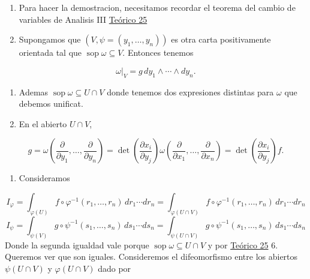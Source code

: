 \begin{bookproof}{}
\begin{enumerate}
\item Para hacer la demostracion, necesitamos recordar el teorema del cambio de variables de Analisis III \hyperref[blk:d9fdaa]{Teórico 25}
\item Supongamos que $(V,\psi=(y_1,\ldots,y_n))$ es otra carta positivamente orientada tal que $\operatorname{sop}\omega\subseteq V$. Entonces tenemos
\end{enumerate}
\[
\omega|_V=g\,dy_1\wedge\cdots\wedge dy_n.
\]
\begin{enumerate}[start=3]
\item Ademas $\operatorname{sop}\omega\subseteq U\cap V$ donde tenemos dos expresiones distintas para $\omega$ que debemos unificat.
\item En el abierto $U\cap V$,
\end{enumerate}
\[
g=\omega\left(\frac{\partial}{\partial y_1},\ldots,\frac{\partial}{\partial y_n}\right)=\det\left(\frac{\partial x_i}{\partial y_j}\right)\omega\left(\frac{\partial}{\partial x_1},\ldots,\frac{\partial}{\partial x_n}\right)=\det\left(\frac{\partial x_i}{\partial y_j}\right)f.
\]
\begin{enumerate}[start=5]
\item Consideramos
\end{enumerate}
\[
I_\varphi=\int_{\varphi(U)}f\circ\varphi^{-1}(r_1,\ldots,r_n)\,dr_1\cdots dr_n=\int_{\varphi(U\cap V)}f\circ\varphi^{-1}(r_1,\ldots,r_n)\,dr_1\cdots dr_n
\]
\[
I_\psi=\int_{\psi(V)}g\circ\psi^{-1}(s_1,\ldots,s_n)\,ds_1\cdots ds_n=\int_{\psi(U\cap V)}g\circ\psi^{-1}(s_1,\ldots,s_n)\,ds_1\cdots ds_n
\]
Donde la segunda igualdad vale porque $\operatorname{sop}\omega\subseteq U\cap V$ y por \hyperref[blk:de3f7e]{Teórico 25} 6. Queremos ver que son iguales. Consideremos el difeomorfismo entre los abiertos $\psi(U\cap V)$ y $\varphi(U\cap V)$ dado por


\end{bookproof}
